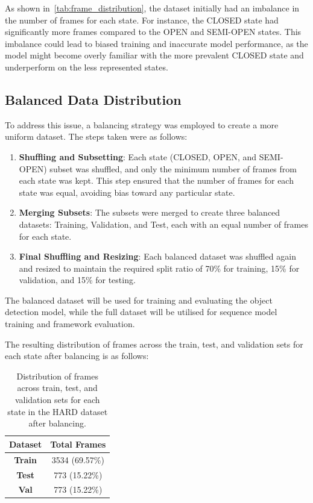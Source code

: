 \documentclass[12pt,oneside]{book} %
\begin{document}
As shown in~\ref{tab:frame_distribution}, the dataset initially had an
imbalance in the number of frames for each state. For instance, the CLOSED
state had significantly more frames compared to the OPEN and SEMI-OPEN states.
This imbalance could lead to biased training and inaccurate model performance,
as the model might become overly familiar with the more prevalent CLOSED state
and underperform on the less represented states.

\subsection{Balanced Data Distribution}
To address this issue, a balancing strategy was employed to create a more
uniform dataset. The steps taken were as follows:
\begin{enumerate}
    \item \textbf{Shuffling and Subsetting}: Each state (CLOSED, OPEN, and SEMI-OPEN) subset was shuffled, and only the minimum number of frames from each state was kept. This step ensured that the number of frames for each state was equal, avoiding bias toward any particular state.
    \item \textbf{Merging Subsets}: The subsets were merged to create three balanced datasets: Training, Validation, and Test, each with an equal number of frames for each state.
    \item \textbf{Final Shuffling and Resizing}: Each balanced dataset was shuffled again and resized to maintain the required split ratio of 70\% for training, 15\% for validation, and 15\% for testing.
\end{enumerate}

The balanced dataset will be used for training and evaluating the object
detection model, while the full dataset will be utilised for sequence model
training and framework evaluation.

The resulting distribution of frames across the train, test, and validation
sets for each state after balancing is as follows:
\begin{table}[H]
    \centering
    \begin{tabular}{@{}cc@{}}
        \toprule
        \textbf{Dataset} & \textbf{Total Frames} \\ \midrule
        \textbf{Train}   & 3534 (69.57\%)        \\ 
        \textbf{Test}    & 773  (15.22\%)        \\ 
        \textbf{Val}     & 773  (15.22\%)        \\ \bottomrule
    \end{tabular}
    \caption{\centering Distribution of frames across train, test, and validation sets for each state in the HARD dataset after balancing.}
    \label{tab:balanced_frame_distribution}
\end{table}
\end{document}
